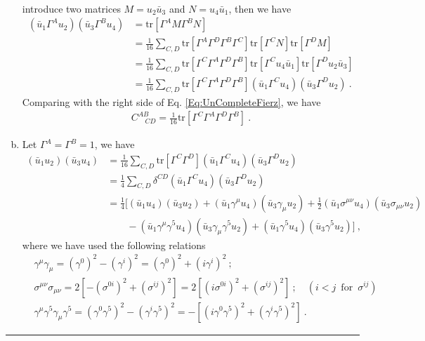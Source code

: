 \documentclass[12pt]{report}
\numberwithin{problemname}{chapter}
\newenvironment{solution}{\vspace{1em}\par\noindent{\large\textbf{\textsc{Solution}}}\par}{\vspace{1em}\hrule}
\begin{document}
\begin{solution}
\begin{enumerate}[(a)]
\begin{align}
    \end{align}
    introduce two matrices $M=u_2\bar{u}_3$ and $N=u_4\bar{u}_1$, then we have
    \begin{align}
        (\bar{u}_1\Gamma^A u_2)(\bar{u}_3\Gamma^B u_4)&=\text{tr}[\Gamma^AM\Gamma^BN] \nonumber \\
        &=\frac{1}{16}\sum_{C,D}\text{tr}[\Gamma^A\Gamma^D\Gamma^B\Gamma^C]\text{tr}[\Gamma^CN]\text{tr}[\Gamma^DM] \nonumber \\
        &=\frac{1}{16}\sum_{C,D}\text{tr}[\Gamma^C\Gamma^A\Gamma^D\Gamma^B]\text{tr}[\Gamma^Cu_4\bar{u}_1]\text{tr}[\Gamma^Du_2\bar{u}_3] \nonumber \\
        &=\frac{1}{16}\sum_{C,D}\text{tr}[\Gamma^C\Gamma^A\Gamma^D\Gamma^B](\bar{u}_1\Gamma^C u_4)(\bar{u}_3\Gamma^D u_2) \ .
    \end{align}
    Comparing with the right side of Eq. \eqref{Eq:UnCompleteFierz}, we have
    \begin{align}
        C^{AB}_{\enspace\enspace CD}=\frac{1}{16}\text{tr}[\Gamma^C\Gamma^A\Gamma^D\Gamma^B]\ .
    \end{align}
    \item Let $\Gamma^A=\Gamma^B=1$, we have
    \begin{align}
        (\bar{u}_1 u_2)(\bar{u}_3 u_4)&=\frac{1}{16}\sum_{C,D}\text{tr}[\Gamma^C\Gamma^D](\bar{u}_1\Gamma^C u_4)(\bar{u}_3\Gamma^D u_2) \nonumber \\
        &=\frac{1}{4}\sum_{C,D}\delta^{CD}(\bar{u}_1\Gamma^C u_4)(\bar{u}_3\Gamma^D u_2) \nonumber \\
        &=\frac{1}{4}\bigg[(\bar{u}_1 u_4)(\bar{u}_3 u_2)+(\bar{u}_1\gamma^{\mu} u_4)(\bar{u}_3\gamma_{\mu} u_2)+\frac{1}{2}(\bar{u}_1\sigma^{\mu\nu} u_4)(\bar{u}_3\sigma_{\mu\nu} u_2) \nonumber \\
        &\quad\quad -(\bar{u}_1\gamma^{\mu}\gamma^5 u_4)(\bar{u}_3\gamma_{\mu}\gamma^5 u_2)+(\bar{u}_1\gamma^5 u_4)(\bar{u}_3\gamma^5 u_2)\bigg]\ ,
    \end{align}
    where we have used the following relations
    \begin{align}
        &\gamma^{\mu}\gamma_{\mu}=(\gamma^0)^2-(\gamma^i)^2=(\gamma^0)^2+(i\gamma^i)^2\ ; \\
        &\sigma^{\mu\nu}\sigma_{\mu\nu}=2[-(\sigma^{0i})^2+(\sigma^{ij})^2]=2[(i\sigma^{0i})^2+(\sigma^{ij})^2]\ ;\quad(i<j\enspace\text{for}\enspace\sigma^{ij}) \\
        &\gamma^{\mu}\gamma^5\gamma_{\mu}\gamma^5=(\gamma^0\gamma^5)^2-(\gamma^i\gamma^5)^2=-[(i\gamma^0\gamma^5)^2+(\gamma^i\gamma^5)^2]\ .

\end{align}
\end{enumerate}
\end{solution}
\end{document}

